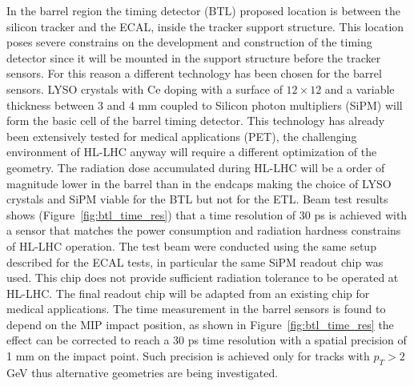 In the barrel region the timing detector (BTL) proposed location is between the silicon tracker and the ECAL, inside the
tracker support structure. This location poses severe constrains on the development and construction of the
timing detector since it will be mounted in the support structure before the tracker sensors. For this reason a
different technology has been chosen for the barrel sensors. LYSO crystals with Ce doping
with a surface of $12\times 12$ and a variable thickness between 3 and 4 mm coupled to Silicon photon multipliers (SiPM)
will form the basic cell of the barrel timing detector. This technology has already been extensively tested
for medical applications (PET), the challenging environment of HL-LHC anyway will require a different optimization
of the geometry. The radiation dose accumulated during HL-LHC will be a order of magnitude lower in the barrel than
in the endcaps making the choice of LYSO crystals and SiPM viable for the BTL but not for the ETL.
Beam test results shows (Figure~\ref{fig:btl_time_res}) that a time resolution of 30 ps is achieved with
a sensor that matches the power consumption and radiation hardness constrains of HL-LHC operation. The test beam
were conducted using the same setup described for the ECAL tests, in particular the same SiPM readout chip was used.
This chip does not provide sufficient radiation tolerance to be operated at HL-LHC. The final readout chip
will be adapted from an existing chip for medical applications.
The time measurement in the barrel sensors is found to depend on the MIP impact position, as shown in Figure~\ref{fig:btl_time_res}
the effect can be corrected to reach a 30 ps time resolution with a spatial precision of 1 mm on the impact point.
Such precision is achieved only for tracks with $p_T > 2$ GeV thus alternative geometries are being investigated.

